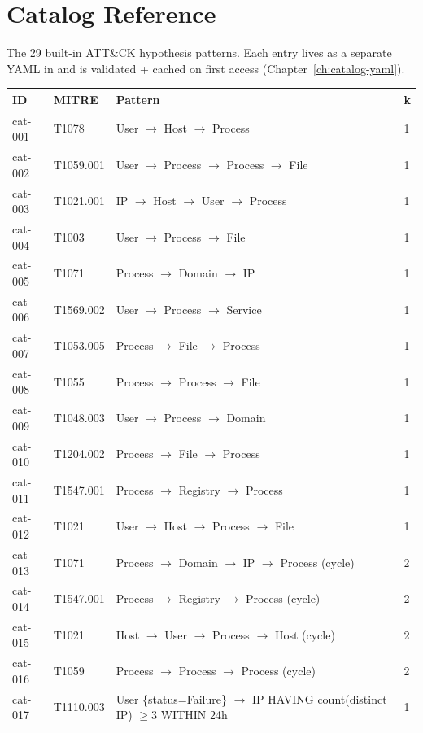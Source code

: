 \chapter{Catalog Reference}
\label{app:catalog}

The 29 built-in ATT\&CK hypothesis patterns. Each entry lives as a
separate YAML in
 and
is validated + cached on first access (Chapter~\ref{ch:catalog-yaml}).

\begin{table}[h]
\centering
\scriptsize
\begin{tabular}{@{}llll@{}}
\toprule
\textbf{ID} & \textbf{MITRE} & \textbf{Pattern} & \textbf{k} \\
\midrule
cat-001 & T1078     & User $\to$ Host $\to$ Process & 1 \\
cat-002 & T1059.001 & User $\to$ Process $\to$ Process $\to$ File & 1 \\
cat-003 & T1021.001 & IP $\to$ Host $\to$ User $\to$ Process & 1 \\
cat-004 & T1003     & User $\to$ Process $\to$ File & 1 \\
cat-005 & T1071     & Process $\to$ Domain $\to$ IP & 1 \\
cat-006 & T1569.002 & User $\to$ Process $\to$ Service & 1 \\
cat-007 & T1053.005 & Process $\to$ File $\to$ Process & 1 \\
cat-008 & T1055     & Process $\to$ Process $\to$ File & 1 \\
cat-009 & T1048.003 & User $\to$ Process $\to$ Domain & 1 \\
cat-010 & T1204.002 & Process $\to$ File $\to$ Process & 1 \\
cat-011 & T1547.001 & Process $\to$ Registry $\to$ Process & 1 \\
cat-012 & T1021     & User $\to$ Host $\to$ Process $\to$ File & 1 \\
cat-013 & T1071     & Process $\to$ Domain $\to$ IP $\to$ Process (cycle) & 2 \\
cat-014 & T1547.001 & Process $\to$ Registry $\to$ Process (cycle) & 2 \\
cat-015 & T1021     & Host $\to$ User $\to$ Process $\to$ Host (cycle) & 2 \\
cat-016 & T1059     & Process $\to$ Process $\to$ Process (cycle) & 2 \\
cat-017 & T1110.003 & User \{status=Failure\} $\to$ IP HAVING count(distinct IP) $\geq 3$ WITHIN 24h & 1 \\

\end{tabular}
\end{table}
